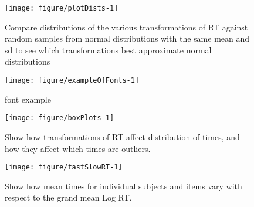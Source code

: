 \documentclass[a4paper]{article}\usepackage[]{graphicx}\usepackage[]{color}
\makeatletter
\def\maxwidth{ %
  \ifdim\Gin@nat@width>\linewidth
    \linewidth
  \else
    \Gin@nat@width
  \fi
}
\newenvironment{knitrout}{}{} %
\makeatother
\begin{document}
\begin{knitrout}
\color{fgcolor}\begin{figure}[hbtp]

\hfill{}\texttt{[image: figure/plotDists-1]} 

\caption[Compare distributions of the various transformations of RT against random samples from normal distributions with the same mean and sd to see which transformations best approximate normal distributions]{Compare distributions of the various transformations of RT against random samples from normal distributions with the same mean and sd to see which transformations best approximate normal distributions}\label{fig:plotDists}
\end{figure}


\end{knitrout}

\begin{knitrout}
\color{fgcolor}\begin{figure}
\texttt{[image: figure/exampleOfFonts-1]} \caption[font example]{font example}\label{fig:exampleOfFonts}
\end{figure}


\end{knitrout}

\begin{knitrout}
\color{fgcolor}\begin{figure}
\texttt{[image: figure/boxPlots-1]} \caption[Show how transformations of RT affect distribution of times, and how they affect which times are outliers]{Show how transformations of RT affect distribution of times, and how they affect which times are outliers.}\label{fig:boxPlots}
\end{figure}


\end{knitrout}
\begin{knitrout}
\color{fgcolor}\begin{figure}
\texttt{[image: figure/fastSlowRT-1]} \caption[Show how mean times for individual subjects and items vary with respect to the grand mean Log RT]{Show how mean times for individual subjects and items vary with respect to the grand mean Log RT.}\label{fig:fastSlowRT}
\end{figure}


\end{knitrout}
\end{document}
